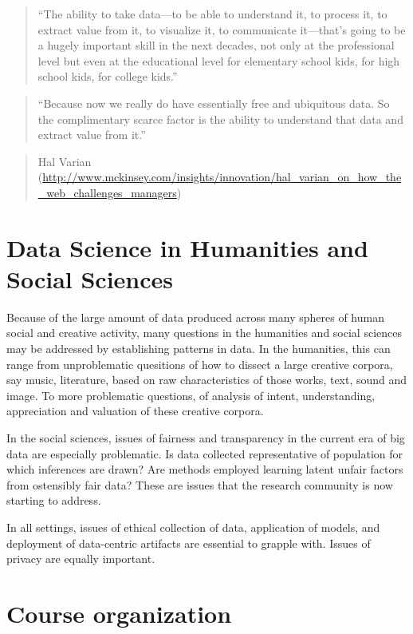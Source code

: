 \documentclass[]{book}
\theoremstyle{definition}
\theoremstyle{definition}
\theoremstyle{remark}
\begin{document}
\begin{quote}
``The ability to take data---to be able to understand it, to process it,
to extract value from it, to visualize it, to communicate it---that's
going to be a hugely important skill in the next decades, not only at
the professional level but even at the educational level for elementary
school kids, for high school kids, for college kids.''
\end{quote}

\begin{quote}
``Because now we really do have essentially free and ubiquitous data. So
the complimentary scarce factor is the ability to understand that data
and extract value from it.''
\end{quote}

\begin{quote}
Hal Varian
(\url{http://www.mckinsey.com/insights/innovation/hal_varian_on_how_the_web_challenges_managers})
\end{quote}

\section{Data Science in Humanities and Social
Sciences}\label{data-science-in-humanities-and-social-sciences}

Because of the large amount of data produced across many spheres of
human social and creative activity, many questions in the humanities and
social sciences may be addressed by establishing patterns in data. In
the humanities, this can range from unproblematic quesitions of how to
dissect a large creative corpora, say music, literature, based on raw
characteristics of those works, text, sound and image. To more
problematic questions, of analysis of intent, understanding,
appreciation and valuation of these creative corpora.

In the social sciences, issues of fairness and transparency in the
current era of big data are especially problematic. Is data collected
representative of population for which inferences are drawn? Are methods
employed learning latent unfair factors from ostensibly fair data? These
are issues that the research community is now starting to address.

In all settings, issues of ethical collection of data, application of
models, and deployment of data-centric artifacts are essential to
grapple with. Issues of privacy are equally important.

\section{Course organization}\label{course-organization}
\end{document}
